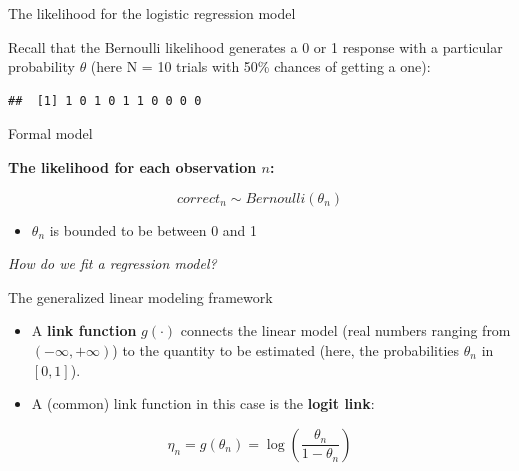 \documentclass[12pt,ignorenonframetext,aspectratio=169]{beamer}
\newenvironment{Shaded}{\begin{snugshade}}{\end{snugshade}}
\newcommand{\CommentTok}[1]{\textcolor[rgb]{0.56,0.35,0.01}{\textit{#1}}}
\newcommand{\DataTypeTok}[1]{\textcolor[rgb]{0.13,0.29,0.53}{#1}}
\newcommand{\DecValTok}[1]{\textcolor[rgb]{0.00,0.00,0.81}{#1}}
\newcommand{\FloatTok}[1]{\textcolor[rgb]{0.00,0.00,0.81}{#1}}
\newcommand{\KeywordTok}[1]{\textcolor[rgb]{0.13,0.29,0.53}{\textbf{#1}}}
\newcommand{\NormalTok}[1]{#1}
\newcommand{\OperatorTok}[1]{\textcolor[rgb]{0.81,0.36,0.00}{\textbf{#1}}}
\newcommand{\StringTok}[1]{\textcolor[rgb]{0.31,0.60,0.02}{#1}}
\providecommand{\tightlist}{%
  \setlength{\itemsep}{0pt}\setlength{\parskip}{0pt}}
\begin{document}
\begin{frame}[fragile]{The likelihood for the logistic regression model}
\protect\hypertarget{the-likelihood-for-the-logistic-regression-model}{}

Recall that the Bernoulli likelihood generates a 0 or 1 response with a particular probability \(\theta\) (here N = 10 trials with 50\% chances of getting a one):

\small

\begin{Shaded}
\end{Shaded}

\begin{verbatim}
##  [1] 1 0 1 0 1 1 0 0 0 0
\end{verbatim}

\normalsize

\end{frame}

\begin{frame}{Formal model}
\protect\hypertarget{formal-model-2}{}

\textbf{The likelihood for each observation \(n\):}

\begin{equation}
correct_n \sim Bernoulli(\theta_n)
\label{eq:bernoullilik}
\end{equation}

\begin{itemize}
\tightlist
\item
  \(\theta_n\) is bounded to be between 0 and 1
\end{itemize}

\emph{How do we fit a regression model?}

\end{frame}

\begin{frame}{The generalized linear modeling framework}
\protect\hypertarget{the-generalized-linear-modeling-framework}{}

\begin{itemize}
\tightlist
\item
  A \textbf{link function} \(g(\cdot)\) connects the linear model (real numbers ranging from \((-\infty,+\infty)\)) to the quantity to be estimated (here, the probabilities \(\theta_n\) in \([0,1]\)).
\item
  A (common) link function in this case is the \textbf{logit link}:
\end{itemize}

\begin{equation}
\eta_n = g(\theta_n) = \log\left(\frac{\theta_n}{1-\theta_n}\right)
\end{equation}

\end{frame}
\end{document}
